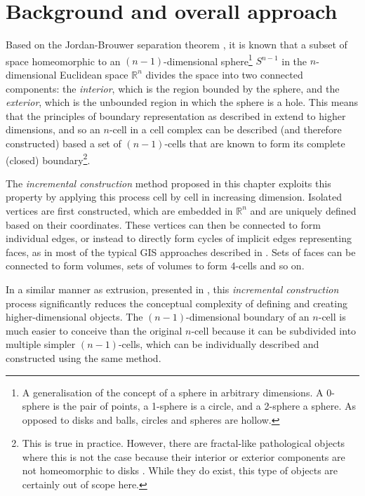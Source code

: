 \section{Background and overall approach}
\label{se:incremental-approach}

Based on the Jordan-Brouwer separation theorem \citep{Lebesgue11,Brouwer11}, it is known that a subset of space homeomorphic to an $(n-1)$-dimensional sphere\footnote{A generalisation of the concept of a sphere in arbitrary dimensions.
A 0-sphere is the pair of points, a 1-sphere is a circle, and a 2-sphere a sphere. As opposed to disks and balls, circles and spheres are hollow.} $S^{n-1}$ in the $n$-dimensional Euclidean space $\mathbb{R}^n$ divides the space into two connected components: the \emph{interior}, which is the region bounded by the sphere, and the \emph{exterior}, which is the unbounded region in which the sphere is a hole.
This means that the principles of boundary representation as described in  extend to higher dimensions, and so an $n$-cell in a cell complex can be described (and therefore constructed) based a set of $(n-1)$-cells that are known to form its complete (closed) boundary\footnote{This is true in practice.
However, there are fractal-like pathological objects where this is not the case because their interior or exterior components are not homeomorphic to disks \citep{Alexander24}.
While they do exist, this type of objects are certainly out of scope here.}.

The \emph{incremental construction} method proposed in this chapter exploits this property by applying this process cell by cell in increasing dimension.
Isolated vertices are first constructed, which are embedded in $\mathbb{R}^n$ and are uniquely defined based on their coordinates.
These vertices can then be connected to form individual edges, or instead to directly form cycles of implicit edges representing faces, as in most of the typical GIS approaches described in .
Sets of faces can be connected to form volumes, sets of volumes to form 4-cells and so on.

In a similar manner as extrusion, presented in , this \emph{incremental construction} process significantly reduces the conceptual complexity of defining and creating higher-dimensional objects.
The $(n-1)$-dimensional boundary of an $n$-cell is much easier to conceive than the original $n$-cell because it can be subdivided into multiple simpler $(n-1)$-cells, which can be individually described and constructed using the same method.

